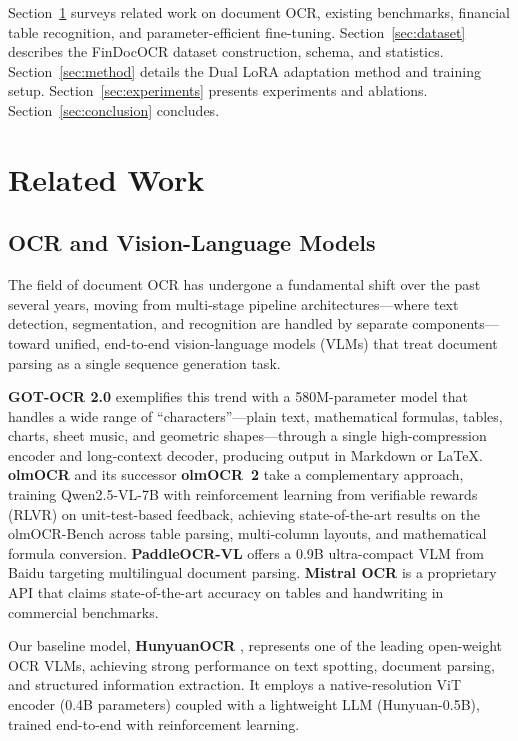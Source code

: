 \documentclass[10pt,twocolumn]{article}
\begin{document}
Section~\ref{sec:related} surveys related work on document OCR, existing
benchmarks, financial table recognition, and parameter-efficient fine-tuning.
Section~\ref{sec:dataset} describes the FinDocOCR dataset construction, schema,
and statistics. Section~\ref{sec:method} details the Dual LoRA adaptation method
and training setup. Section~\ref{sec:experiments} presents experiments and
ablations. Section~\ref{sec:conclusion} concludes.

\section{Related Work}
\label{sec:related}

\subsection{OCR and Vision-Language Models}
\label{sec:related:ocr}

The field of document OCR has undergone a fundamental shift over the past several
years, moving from multi-stage pipeline architectures---where text detection,
segmentation, and recognition are handled by separate components---toward unified,
end-to-end vision-language models (VLMs) that treat document parsing as a single
sequence generation task.

\textbf{GOT-OCR 2.0} \cite{wei2024gotocr2} exemplifies this trend with a
580M-parameter model that handles a wide range of ``characters''---plain text,
mathematical formulas, tables, charts, sheet music, and geometric
shapes---through a single high-compression encoder and long-context decoder,
producing output in Markdown or LaTeX. \textbf{olmOCR} \cite{poznanski2025olmocr}
and its successor \textbf{olmOCR~2} \cite{poznanski2025olmocr2} take a
complementary approach, training Qwen2.5-VL-7B with reinforcement learning from
verifiable rewards (RLVR) on unit-test-based feedback, achieving state-of-the-art
results on the olmOCR-Bench across table parsing, multi-column layouts, and
mathematical formula conversion. \textbf{PaddleOCR-VL}
\cite{cui2025paddleocrvl} offers a 0.9B ultra-compact VLM from Baidu targeting
multilingual document parsing. \textbf{Mistral OCR} \cite{mistral2025ocr} is a
proprietary API that claims state-of-the-art accuracy on tables and handwriting
in commercial benchmarks.

Our baseline model, \textbf{HunyuanOCR} \cite{hunyuanocr2025}, represents one
of the leading open-weight OCR VLMs, achieving strong performance on text
spotting, document parsing, and structured information extraction. It employs a
native-resolution ViT encoder (0.4B parameters) coupled with a lightweight LLM
(Hunyuan-0.5B), trained end-to-end with reinforcement learning.
\end{document}
